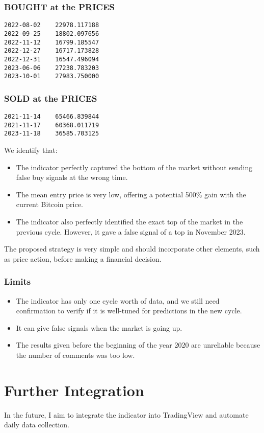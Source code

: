 \documentclass[12pt,a4paper]{article}
\begin{document}
\subsubsection*{BOUGHT at the PRICES}
\begin{verbatim}
2022-08-02    22978.117188
2022-09-25    18802.097656
2022-11-12    16799.185547
2022-12-27    16717.173828
2022-12-31    16547.496094
2023-06-06    27238.783203
2023-10-01    27983.750000
\end{verbatim}

\subsubsection*{SOLD at the PRICES}
\begin{verbatim}
2021-11-14    65466.839844
2021-11-17    60368.011719
2023-11-18    36585.703125
\end{verbatim}

\noindent We identify that:
\begin{itemize}
    \item The indicator perfectly captured the bottom of the market without sending false buy signals at the wrong time.
    \item The mean entry price is very low, offering a potential 500\% gain with the current Bitcoin price.
    \item The indicator also perfectly identified the exact top of the market in the previous cycle. However, it gave a false signal of a top in November 2023.
\end{itemize}

\noindent The proposed strategy is very simple and should incorporate other elements, such as price action, before making a financial decision.

\subsubsection*{Limits}
\begin{itemize}
    \item The indicator has only one cycle worth of data, and we still need confirmation to verify if it is well-tuned for predictions in the new cycle.
    \item It can give false signals when the market is going up.
    \item The results given before the beginning of the year 2020 are unreliable because the number of comments was too low.
\end{itemize}
\section*{Further Integration}
In the future, I aim to integrate the indicator into TradingView and automate daily data collection.
\end{document}

